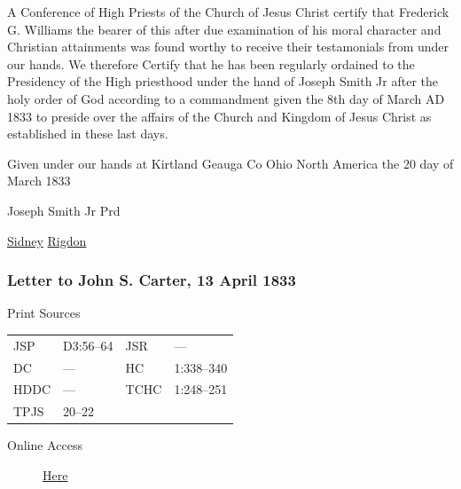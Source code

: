 				A Conference of High Priests of the Church of Jesus Christ certify that Frederick G. Williams the bearer of this after due examination of his moral character and Christian attainments was found worthy to receive their testamonials from under our hands. We therefore Certify that he has been regularly ordained to the Presidency of the High priesthood under the hand of Joseph Smith Jr after the holy order of God according to a commandment given the 8th day of March AD 1833 to preside over the affairs of the Church and Kingdom of Jesus Christ as established in these last days.
				
				Given under our hands at Kirtland Geauga Co Ohio North America the 20 day of March 1833
				
				\begin{tightright}
				Joseph Smith Jr Prd
				
				\uline{Sidney} \uline{Rigdon}
				\end{tightright}
				
		\subsubsection{Letter to John S. Carter, 13 April 1833}
			\label{EMS-1833-JS-13-APR-1833}
		
			\begin{description}
				\item[Print Sources]
			\end{description}

				\begin{tabular}{p{0.5in}p{1in}p{0.5in}p{1in}}
				JSP	 	& D3:56--64		& JSR 		& --- \\
				DC	 	& --- 			& HC 		& 1:338--340 \\
				HDDC 	& ---			& TCHC 		& 1:248--251 \\
				TPJS 	& 20--22		& 	 		&  \\
				\end{tabular}
			
			\begin{description}
				\item[Online Access] \href{https://www.josephsmithpapers.org/paper-summary/letter-to-john-s-carter-13-april-1833/1}{Here}
			\end{description}
			
